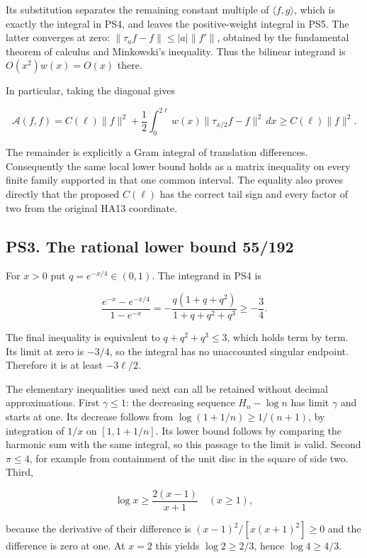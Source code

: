 \documentclass[
  10pt,
  a4paper,
]{article}
\begin{document}
Its substitution separates the remaining constant multiple of
\(\langle f,g\rangle\), which is exactly the integral in PS4, and leaves
the positive-weight integral in PS5. The latter converges at zero:
\(\|\tau_a f-f\|\le |a|\|f'\|\), obtained by the fundamental theorem of
calculus and Minkowski's inequality. Thus the bilinear integrand is
\(O(x^2)w(x)=O(x)\) there.

In particular, taking the diagonal gives

\[
\mathcal A(f,f)=C(\ell)\|f\|^2
+\frac12\int_0^{2\ell}w(x)
\|\tau_{x/2}f-f\|^2\,dx
\ge C(\ell)\|f\|^2.
\tag{PS6}
\]

The remainder is explicitly a Gram integral of translation differences.
Consequently the same local lower bound holds as a matrix inequality on
every finite family supported in that one common interval. The equality
also proves directly that the proposed \(C(\ell)\) has the correct tail
sign and every factor of two from the original HA13 coordinate.

\subsection{PS3. The rational lower bound
55/192}\label{ps3.-the-rational-lower-bound-55192}

For \(x>0\) put \(q=e^{-x/4}\in(0,1)\). The integrand in PS4 is

\[
\frac{e^{-x}-e^{-x/4}}{1-e^{-x}}
=-\frac{q(1+q+q^2)}{1+q+q^2+q^3}\ge-\frac34.
\tag{PS7}
\]

The final inequality is equivalent to \(q+q^2+q^3\le3\), which holds
term by term. Its limit at zero is \(-3/4\), so the integral has no
unaccounted singular endpoint. Therefore it is at least \(-3\ell/2\).

The elementary inequalities used next can all be retained without
decimal approximations. First \(\gamma\le1\): the decreasing sequence
\(H_n-\log n\) has limit \(\gamma\) and starts at one. Its decrease
follows from \(\log(1+1/n)\ge1/(n+1)\), by integration of \(1/x\) on
\([1,1+1/n]\). Its lower bound follows by comparing the harmonic sum
with the same integral, so this passage to the limit is valid. Second
\(\pi\le4\), for example from containment of the unit disc in the square
of side two. Third,

\[
\log x\ge\frac{2(x-1)}{x+1}\quad(x\ge1),
\]

because the derivative of their difference is \((x-1)^2/[x(x+1)^2]\ge0\)
and the difference is zero at one. At \(x=2\) this yields
\(\log2\ge2/3\), hence \(\log4\ge4/3\).
\end{document}
